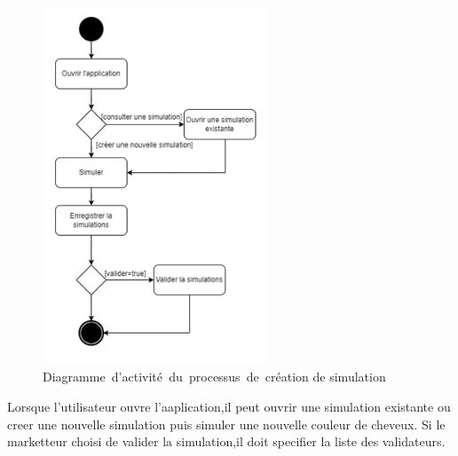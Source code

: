 \begin{figure}[!ht]\centering
\includegraphics[width=0.6\textwidth,angle=00]{chapitres/chapitre5/figures/ActChap5.png}
\caption{Diagramme\textcolor{white}{J}d'activité\textcolor{white}{J}du\textcolor{white}{J}processus\textcolor{white}{J}de\textcolor{white}{J}création de simulation}
\label{fig:OffreAct}
\end{figure}

Lorsque l'utilisateur ouvre l'aaplication,il peut ouvrir une simulation existante ou creer une nouvelle simulation puis simuler une nouvelle couleur de cheveux.
Si le marketteur choisi de valider la simulation,il doit specifier la liste des validateurs.

\newpage
